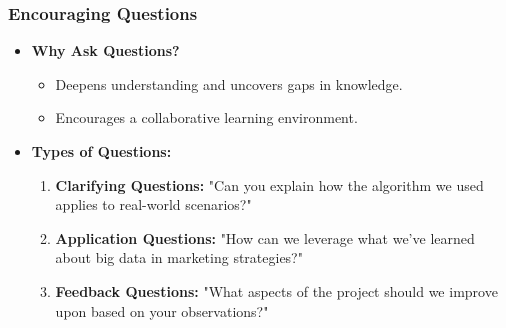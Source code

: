 \documentclass[aspectratio=169]{beamer}
\begin{document}
\begin{frame}[fragile]
  \frametitle{Encouraging Questions}
  \begin{itemize}
    \item \textbf{Why Ask Questions?}
      \begin{itemize}
        \item Deepens understanding and uncovers gaps in knowledge.
        \item Encourages a collaborative learning environment.
      \end{itemize}
    
    \item \textbf{Types of Questions:}
      \begin{enumerate}
        \item \textbf{Clarifying Questions:} "Can you explain how the algorithm we used applies to real-world scenarios?"
        \item \textbf{Application Questions:} "How can we leverage what we've learned about big data in marketing strategies?"
        \item \textbf{Feedback Questions:} "What aspects of the project should we improve upon based on your observations?"
      \end{enumerate}
  \end{itemize}
\end{frame}
\end{document}

